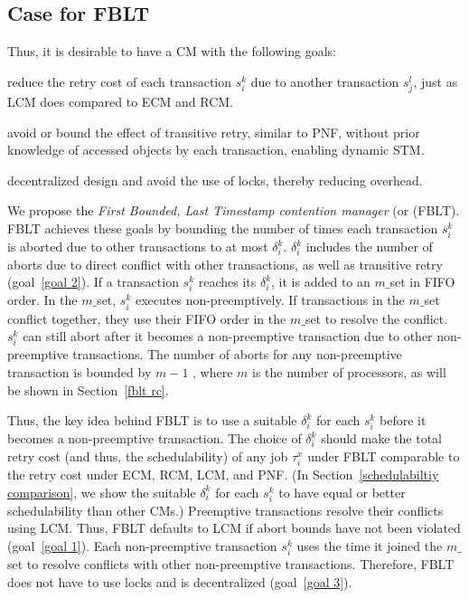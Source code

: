 \documentclass[prodmode,acmtecs]{acmsmall}
\begin{document}
\subsection{Case for FBLT}

Thus, it is desirable to have a CM with the following goals:
\begin{compactenum}
\item \label{goal 1} reduce the retry cost of each transaction $s_i^k$ due to another transaction $s_j^l$, just as LCM does compared to ECM and RCM.
\item \label{goal 2} avoid or bound the effect of transitive retry, similar to PNF, without prior knowledge of accessed objects by each transaction, enabling dynamic STM.
\item \label{goal 3} decentralized design and avoid the use of locks, thereby reducing  overhead.
\end{compactenum}

We propose the \textit{First Bounded, Last Timestamp contention manager} (or (FBLT). FBLT achieves these goals by bounding the number of times each transaction $s_i^k$ is aborted due to other transactions to at most $\delta_i^k$. $\delta_i^k$ includes the number of aborts due to direct conflict with other transactions, as well as transitive retry (goal~\ref{goal 2}). If a transaction $s_i^k$ reaches its $\delta_i^k$, it is added to an $m\_$set in FIFO order. In the $m\_$set, $s_i^k$ executes non-preemptively. If transactions in the $m\_$set conflict together, they use their FIFO order in the $m\_$set to resolve the conflict. $s_i^k$ can still abort after it becomes a non-preemptive transaction due to other non-preemptive transactions. The number of aborts for any non-preemptive transaction is bounded by $m-1$ , where $m$ is the number of processors, as will be shown in Section~\ref{fblt rc}. 

Thus, the key idea behind FBLT is to use a suitable $\delta_i^k$ for each $s_i^k$ before it becomes a non-preemptive transaction. The choice of $\delta_i^k$ should make the total retry cost (and thus, the schedulability) of any job $\tau_i^x$ under FBLT comparable to the retry cost under ECM, RCM, LCM, and PNF. (In Section~\ref{schedulabiltiy comparison}, we show the suitable $\delta_i^k$ for each $s_i^k$ to have equal or better schedulability than other CMs.) Preemptive transactions resolve their conflicts using LCM.  Thus, FBLT defaults to LCM if abort bounds have not been violated (goal~\ref{goal 1}). Each non-preemptive transaction $s_i^k$  uses the time it joined the $m\_$set to resolve conflicts with other non-preemptive transactions. Therefore, FBLT does not have to use locks and is decentralized (goal~\ref{goal 3}).
\end{document}
